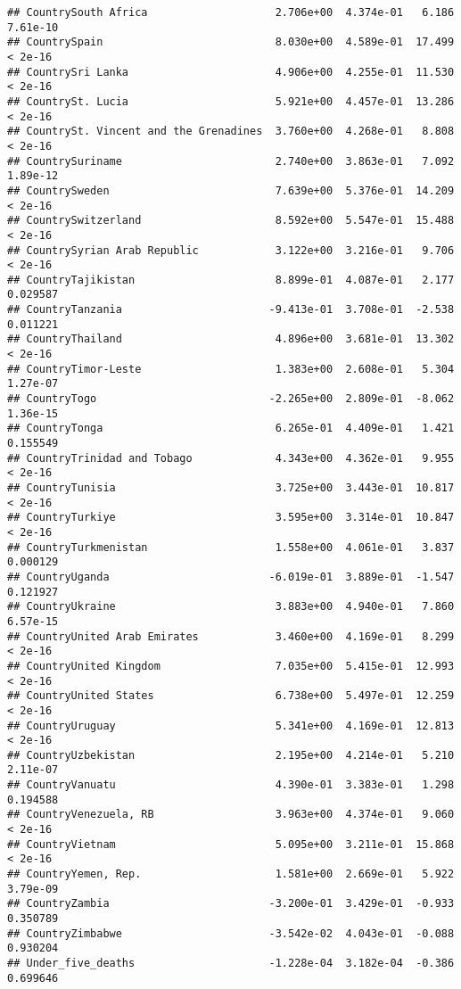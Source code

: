 \documentclass[
]{article}
\begin{document}
\begin{verbatim}
## CountrySouth Africa                    2.706e+00  4.374e-01   6.186 7.61e-10
## CountrySpain                           8.030e+00  4.589e-01  17.499  < 2e-16
## CountrySri Lanka                       4.906e+00  4.255e-01  11.530  < 2e-16
## CountrySt. Lucia                       5.921e+00  4.457e-01  13.286  < 2e-16
## CountrySt. Vincent and the Grenadines  3.760e+00  4.268e-01   8.808  < 2e-16
## CountrySuriname                        2.740e+00  3.863e-01   7.092 1.89e-12
## CountrySweden                          7.639e+00  5.376e-01  14.209  < 2e-16
## CountrySwitzerland                     8.592e+00  5.547e-01  15.488  < 2e-16
## CountrySyrian Arab Republic            3.122e+00  3.216e-01   9.706  < 2e-16
## CountryTajikistan                      8.899e-01  4.087e-01   2.177 0.029587
## CountryTanzania                       -9.413e-01  3.708e-01  -2.538 0.011221
## CountryThailand                        4.896e+00  3.681e-01  13.302  < 2e-16
## CountryTimor-Leste                     1.383e+00  2.608e-01   5.304 1.27e-07
## CountryTogo                           -2.265e+00  2.809e-01  -8.062 1.36e-15
## CountryTonga                           6.265e-01  4.409e-01   1.421 0.155549
## CountryTrinidad and Tobago             4.343e+00  4.362e-01   9.955  < 2e-16
## CountryTunisia                         3.725e+00  3.443e-01  10.817  < 2e-16
## CountryTurkiye                         3.595e+00  3.314e-01  10.847  < 2e-16
## CountryTurkmenistan                    1.558e+00  4.061e-01   3.837 0.000129
## CountryUganda                         -6.019e-01  3.889e-01  -1.547 0.121927
## CountryUkraine                         3.883e+00  4.940e-01   7.860 6.57e-15
## CountryUnited Arab Emirates            3.460e+00  4.169e-01   8.299  < 2e-16
## CountryUnited Kingdom                  7.035e+00  5.415e-01  12.993  < 2e-16
## CountryUnited States                   6.738e+00  5.497e-01  12.259  < 2e-16
## CountryUruguay                         5.341e+00  4.169e-01  12.813  < 2e-16
## CountryUzbekistan                      2.195e+00  4.214e-01   5.210 2.11e-07
## CountryVanuatu                         4.390e-01  3.383e-01   1.298 0.194588
## CountryVenezuela, RB                   3.963e+00  4.374e-01   9.060  < 2e-16
## CountryVietnam                         5.095e+00  3.211e-01  15.868  < 2e-16
## CountryYemen, Rep.                     1.581e+00  2.669e-01   5.922 3.79e-09
## CountryZambia                         -3.200e-01  3.429e-01  -0.933 0.350789
## CountryZimbabwe                       -3.542e-02  4.043e-01  -0.088 0.930204
## Under_five_deaths                     -1.228e-04  3.182e-04  -0.386 0.699646

\end{verbatim}
\end{document}
